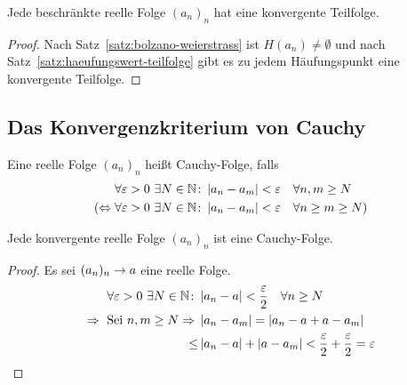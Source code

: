 \begin{korollar}
    \label{korollar:beschr-konv-teilfolge}
    Jede beschränkte reelle Folge $(a_n)_n$ hat eine konvergente Teilfolge.
    \begin{proof}
        Nach Satz~\ref{satz:bolzano-weierstrass} ist $H(a_n) \neq\emptyset$ und nach Satz~\ref{satz:haeufungswert-teilfolge} gibt es zu jedem Häufungspunkt eine konvergente Teilfolge.
    \end{proof}
\end{korollar}

\vfill

\subsection{Das Konvergenzkriterium von Cauchy}

\begin{definition}
    Eine reelle Folge $(a_n)_n$ heißt Cauchy-Folge, falls
    \begin{align*}
        &\forall\varepsilon > 0~\exists N\in\mathbb{N}\colon \left|a_n - a_m\right| < \varepsilon\quad\forall n,m \geq N\\
        (\Leftrightarrow{} &\forall \varepsilon > 0~\exists N\in\mathbb{N}\colon \left|a_n - a_m\right| < \varepsilon\quad\forall n\geq m\geq N)
    \end{align*}
\end{definition}

\begin{lemma} %
    \label{lemma:konv-cauchy}
    Jede konvergente reelle Folge $(a_n)_n$ ist eine Cauchy-Folge.
    \begin{proof}
        Es sei $(a_n)_n\rightarrow{} a$ eine reelle Folge.
        \begin{align*}
            \forall \varepsilon > 0~\exists N\in\mathbb{N}\colon &\left|a_n-a\right| < \frac{\varepsilon}{2}\quad\forall n\geq N\\
            \Rightarrow{}\text{ Sei }n,m\geq N \Rightarrow{} &\left|a_n-a_m\right| = \left|a_n-a+a-a_m\right|\\
            \leq &\left|a_n-a\right| + \left|a-a_m\right| < \frac{\varepsilon}{2} + \frac{\varepsilon}{2} = \varepsilon\qedhere
        \end{align*}
    \end{proof}
\end{lemma}

